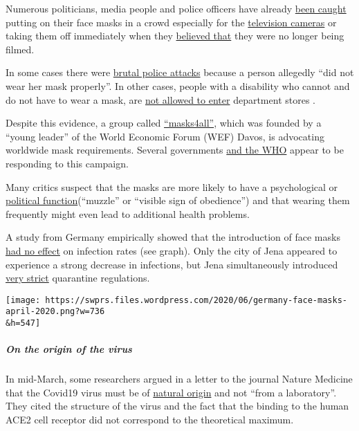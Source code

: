 Numerous politicians, media people and police officers have already
\href{https://www.youtube.com/watch?v=y2qAKS6Hl4I}{been caught} putting
on their face masks in a crowd especially for the
\href{https://twitter.com/DailyCaller/status/1265382872631980032}{television
cameras} or taking them off immediately when they
\href{https://twitter.com/realPowerTie/status/1261445611594723330}{believed
that} they were no longer being filmed.

In some cases there were
\href{https://twitter.com/DrRJKavanagh/status/1260739779177656325}{brutal
police attacks} because a person allegedly ``did not wear her mask
properly''. In other cases, people with a disability who cannot and do
not have to wear a mask, are
\href{https://bnn.de/lokales/karlsruhe/maskenpflicht-behinderte-sind-befreit-und-werden-dafuer-teils-beschimpft}{not
allowed to enter} department stores .

Despite this evidence, a group called
\href{https://masks4all.co/about-us/}{``masks4all''}, which was founded
by a ``young leader'' of the World Economic Forum (WEF) Davos, is
advocating worldwide mask requirements. Several governments
\href{https://www.businessinsider.com/who-updates-face-masks-recommendations-amid-the-coronavirus-pandemic-2020-6}{and
the WHO} appear to be responding to this campaign.

Many critics suspect that the masks are more likely to have a
psychological or
\href{https://multipolar-magazin.de/artikel/maskenpflicht-gesellschaftliches-klima}{political
function}(``muzzle'' or ``visible sign of obedience'') and that wearing
them frequently might even lead to additional health problems.

A study from Germany empirically showed that the introduction of face
masks \href{http://ftp.iza.org/dp13319.pdf\#page=28}{had no effect} on
infection rates (see graph). Only the city of Jena appeared to
experience a strong decrease in infections, but Jena simultaneously
introduced
\href{https://www.mdr.de/thueringen/ost-thueringen/jena/corona-jena-seit-einer-woche-keine-neuinfektion-100.html}{very
strict} quarantine regulations.

\texttt{[image: https://swprs.files.wordpress.com/2020/06/germany-face-masks-april-2020.png?w=736\\\&h=547]}

\hypertarget{on-the-origin-of-the-virus}{%
\subparagraph{\texorpdfstring{\textbf{On the origin of the
virus}}{On the origin of the virus}}\label{on-the-origin-of-the-virus}}

In mid-March, some researchers argued in a letter to the journal Nature
Medicine that the Covid19 virus must be of
\href{https://www.nature.com/articles/s41591-020-0820-9}{natural origin}
and not ``from a laboratory''. They cited the structure of the virus and
the fact that the binding to the human ACE2 cell receptor did not
correspond to the theoretical maximum.

